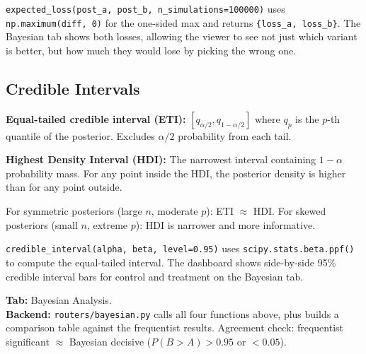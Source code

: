 \documentclass[11pt,a4paper]{article}
\newcommand{\code}[1]{\texttt{#1}}
\newcommand{\scipy}[1]{\texttt{scipy.stats.#1}}
\newcommand{\numpy}[1]{\texttt{np.#1}}
\begin{document}
\vspace{8pt}

\begin{application}
\code{expected\_loss(post\_a, post\_b, n\_simulations=100000)} uses \numpy{maximum(diff, 0)} for the one-sided max and returns \code{\{loss\_a, loss\_b\}}. The Bayesian tab shows both losses, allowing the viewer to see not just which variant is better, but how much they would lose by picking the wrong one.
\end{application}

\subsection{Credible Intervals}

\begin{formaldef}
\textbf{Equal-tailed credible interval (ETI):} $[q_{\alpha/2}, q_{1-\alpha/2}]$ where $q_p$ is the $p$-th quantile of the posterior. Excludes $\alpha/2$ probability from each tail.

\textbf{Highest Density Interval (HDI):} The narrowest interval containing $1-\alpha$ probability mass. For any point inside the HDI, the posterior density is higher than for any point outside.

\medskip
For symmetric posteriors (large $n$, moderate $p$): ETI $\approx$ HDI. For skewed posteriors (small $n$, extreme $p$): HDI is narrower and more informative.
\end{formaldef}

\vspace{8pt}

\begin{application}
\code{credible\_interval(alpha, beta, level=0.95)} uses \scipy{beta.ppf()} to compute the equal-tailed interval. The dashboard shows side-by-side 95\% credible interval bars for control and treatment on the Bayesian tab.
\end{application}

\vspace{8pt}

\begin{dashlink}
\textbf{Tab:} Bayesian Analysis.\\
\textbf{Backend:} \code{routers/bayesian.py} calls all four functions above, plus builds a comparison table against the frequentist results. Agreement check: frequentist significant $\approx$ Bayesian decisive ($P(B>A) > 0.95$ or $< 0.05$).
\end{dashlink}
\end{document}
